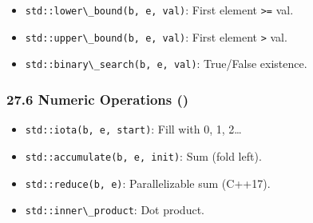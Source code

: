 \begin{itemize}
\tightlist
\item
  \passthrough{\lstinline!std::lower\_bound(b, e, val)!}: First element
  \passthrough{\lstinline!>=!} val.
\item
  \passthrough{\lstinline!std::upper\_bound(b, e, val)!}: First element
  \passthrough{\lstinline!>!} val.
\item
  \passthrough{\lstinline!std::binary\_search(b, e, val)!}: True/False
  existence.
\end{itemize}

\hypertarget{numeric-operations}{%
\subsubsection{27.6 Numeric Operations ()}\label{numeric-operations}}

\begin{itemize}
\tightlist
\item
  \passthrough{\lstinline!std::iota(b, e, start)!}: Fill with 0, 1,
  2\ldots{}
\item
  \passthrough{\lstinline!std::accumulate(b, e, init)!}: Sum (fold
  left).
\item
  \passthrough{\lstinline!std::reduce(b, e)!}: Parallelizable sum
  (C++17).
\item
  \passthrough{\lstinline!std::inner\_product!}: Dot product.
\end{itemize}
